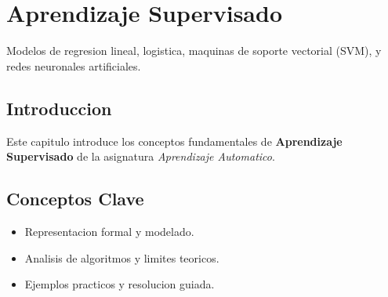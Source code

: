 \chapter{Aprendizaje Supervisado}
\label{ch:aprendizaje_supervisado}

Modelos de regresion lineal, logistica, maquinas de soporte vectorial (SVM), y redes neuronales artificiales.

\section{Introduccion}
Este capitulo introduce los conceptos fundamentales de \textbf{Aprendizaje Supervisado} de la asignatura \textit{Aprendizaje Automatico}.

\section{Conceptos Clave}
\begin{itemize}
    \item Representacion formal y modelado.
    \item Analisis de algoritmos y limites teoricos.
    \item Ejemplos practicos y resolucion guiada.
\end{itemize}
